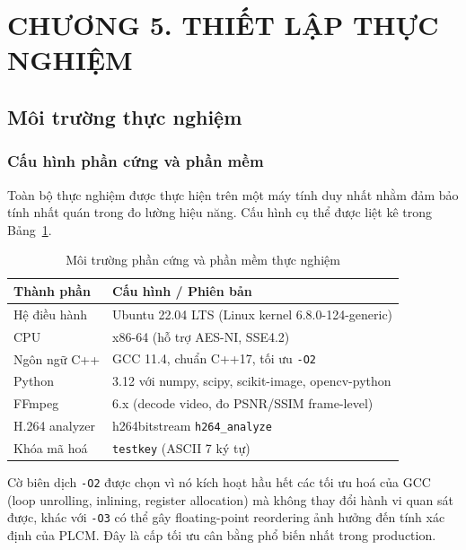 \clearpage
{}
\section*{CHƯƠNG 5. THIẾT LẬP THỰC NGHIỆM}
\setcounter{section}{5}
\setcounter{subsection}{0}
\setcounter{figure}{0}
\setcounter{table}{0}
\setcounter{equation}{0}

\subsection{Môi trường thực nghiệm}

\subsubsection{Cấu hình phần cứng và phần mềm}

Toàn bộ thực nghiệm được thực hiện trên một máy tính duy nhất nhằm đảm bảo tính nhất quán trong đo lường hiệu năng. Cấu hình cụ thể được liệt kê trong Bảng~\ref{tab:env}.

\begin{table}[ht]
\centering
\caption{Môi trường phần cứng và phần mềm thực nghiệm}
\label{tab:env}
\begin{tabular}{|l|l|}
\hline
\textbf{Thành phần} & \textbf{Cấu hình / Phiên bản} \\
\hline
Hệ điều hành        & Ubuntu 22.04 LTS (Linux kernel 6.8.0-124-generic) \\
\hline
CPU                  & x86-64 (hỗ trợ AES-NI, SSE4.2) \\
\hline
Ngôn ngữ C++         & GCC 11.4, chuẩn C++17, tối ưu \texttt{-O2} \\
\hline
Python               & 3.12 với numpy, scipy, scikit-image, opencv-python \\
\hline
FFmpeg               & 6.x (decode video, đo PSNR/SSIM frame-level) \\
\hline
H.264 analyzer       & h264bitstream \texttt{h264\_analyze}~\cite{h264bitstream} \\
\hline
Khóa mã hoá         & \texttt{testkey} (ASCII 7 ký tự) \\
\hline
\end{tabular}
\end{table}

Cờ biên dịch \texttt{-O2} được chọn vì nó kích hoạt hầu hết các tối ưu hoá của GCC (loop unrolling, inlining, register allocation) mà không thay đổi hành vi quan sát được, khác với \texttt{-O3} có thể gây floating-point reordering ảnh hưởng đến tính xác định của PLCM. Đây là cấp tối ưu cân bằng phổ biến nhất trong production.

